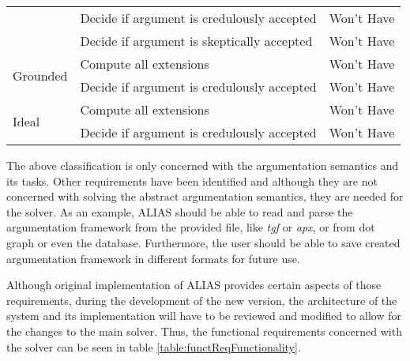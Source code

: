 \begin{longtable}{|l|l|l|}
	& Decide if argument is credulously accepted & Won't Have      \\ \cline{2-3} 
	& Decide if argument is skeptically accepted & Won't Have      \\ \hline
	\multirow{2}{*}{Grounded}    & Compute all extensions                           & Won't Have      \\ \cline{2-3} 
	& Decide if argument is credulously accepted & Won't Have      \\ \hline
	\multirow{2}{*}{Ideal}       & Compute all extensions                           & Won't Have      \\ \cline{2-3} 
	& Decide if argument is credulously accepted & Won't Have      \\ \hline
\end{longtable}

The above classification is only concerned with the argumentation semantics and its tasks. Other requirements have been identified and although they are not concerned with solving the abstract argumentation semantics, they are needed for the solver. As an example, ALIAS should be able to read and parse the argumentation framework from the provided file, like \textit{tgf} or \textit{apx}, or from dot graph or even the database. Furthermore, the user should be able to save created argumentation framework in different formats for future use. 

Although original implementation of ALIAS provides certain aspects of those requirements, during the development of the new version, the architecture of the system and its implementation will have to be reviewed and modified to allow for the changes to the main solver. Thus, the functional requirements concerned with the solver can be seen in table \ref{table:functReqFunctionality}.

